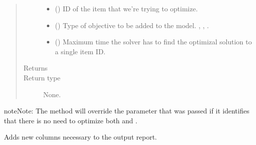 \documentclass[letterpaper,10pt,english]{sphinxmanual}
\begin{document}
\begin{fulllineitems}
\begin{fulllineitems}
\begin{quote}
\begin{description}
\begin{itemize}
\item {} 
 () \textendash{} ID of the item that we’re trying to optimize.

\item {} 
 () \textendash{} Type of objective to be added to the model. , , .

\item {} 
 () \textendash{} Maximum time the solver has to find the optimizal solution to a single item ID.

\end{itemize}

\item[{Returns}] \leavevmode


\item[{Return type}] \leavevmode
None.

\end{description}\end{quote}

\begin{sphinxadmonition}{note}{Note:}
The method {\hyperref[\detokenize{source/optimization.model:optimization.model.optimizer.OptimizationModel._check_optimization_objective}]{}}             will override the  parameter that was passed if it identifies that there is no need to optimize both  and .
\end{sphinxadmonition}

\end{fulllineitems}


\begin{fulllineitems}
\label{\detokenize{source/optimization.model:optimization.model.optimizer.OptimizationModel._add_providing_columns}}
Adds new columns necessary to the output report.


\end{fulllineitems}
\end{fulllineitems}
\end{document}
